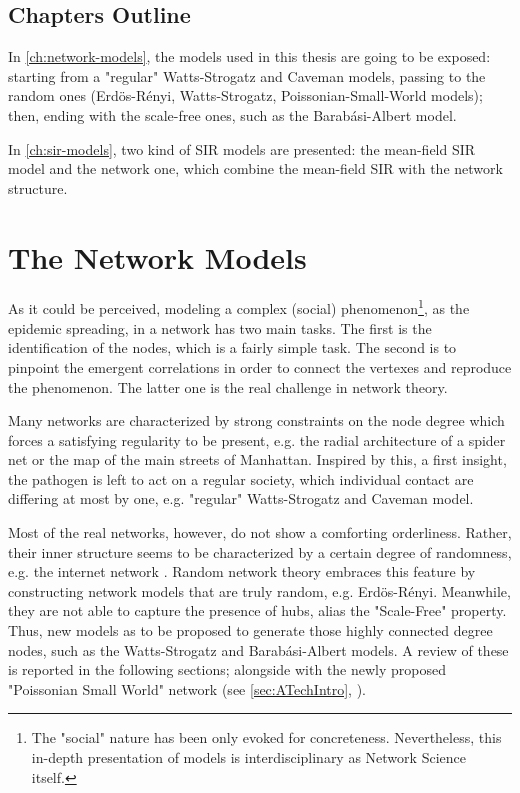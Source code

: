 \documentclass[a4paper,12pt,twoside]{book} %
\theoremstyle{definition}
\begin{document}
\section{Chapters Outline}
In \autoref{ch:network-models}, the models used in this thesis are going to be exposed: starting from a "regular" Watts-Strogatz and Caveman models, passing to the random ones (Erdös-Rényi, Watts-Strogatz, Poissonian-Small-World models); then, ending with the scale-free ones, such as the Barabási-Albert model. 

In \autoref{ch:sir-models}, two kind of SIR models are presented: the mean-field SIR model and the network one, which combine the mean-field SIR with the network structure.

\chapter{The Network Models}
\label{ch:network-models}
As it could be perceived, modeling a complex (social) phenomenon\footnote{The "social" nature has been only evoked for concreteness. Nevertheless, this in-depth presentation of models is interdisciplinary as Network Science itself.}, as the epidemic spreading, in a network has two main tasks. The first is the identification of the nodes, which is a fairly simple task. The second is to pinpoint the emergent correlations in order to connect the vertexes and reproduce the phenomenon. The latter one is the real challenge in network theory.

Many networks are characterized by strong constraints on the node degree which forces a satisfying regularity to be present, e.g. the radial architecture of a spider net or the map of the main streets of Manhattan.
Inspired by this, a first insight, the pathogen is left to act on a regular society, which individual contact are differing at most by one, e.g. "regular" Watts-Strogatz and Caveman model.

Most of the real networks, however, do not show a comforting orderliness. 
Rather, their inner structure seems to be characterized by a certain degree of randomness, e.g. the internet network \cite{barabasi::2016networkbook}. Random network theory embraces this feature by constructing network models that are truly random, e.g. Erdös-Rényi. Meanwhile, they are not able to capture the presence of hubs, alias the "Scale-Free" property. Thus, new models as to be proposed to generate those highly connected degree nodes, such as the Watts-Strogatz and Barabási-Albert models.
A review of these is reported in the following sections; alongside with the newly proposed "Poissonian Small World" network (see \autoref{sec:ATechIntro}, \cite{Thurner::NetBasedExpl}).
\end{document}
